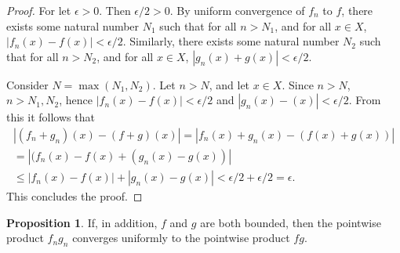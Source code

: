\documentclass[12pt]{article}
\theoremstyle{definition}
\newtheorem{proposition}{Proposition}
\begin{document}
\begin{proof}
For let $\epsilon > 0$. Then $\epsilon /2 > 0$. By uniform convergence of $ f_n $ to $f$, there exists some natural number $N_1$ such that for all 
$n>N_1$, and for all $x\in X$, $ |f_n(x) - f(x) | < \epsilon/2 $. Similarly, there exists some natural number $N_2$ such that for all $n>N_2$, and for 
all $x\in X $, $| g_n(x) + g(x) | < \epsilon /2$. 

Consider $ N = \max(N_1, N_2)$. Let $n> N$, and let $x\in X$. Since $n> N$, $n> N_1, N_2$, hence $ |f_n(x) - f(x)| < \epsilon/2 $ and $ |g_n(x) - 
(x)|<\epsilon /2 $. From this it follows that 
\begin{equation}
	\begin{split}
		|(f_n + g_n)(x) - (f+g)(x)| = |f_n(x) + g_n(x) - (f(x) + g(x))| \\
		= |(f_n(x) - f(x) + (g_n(x) - g(x))| \\
		\le |f_n(x) - f(x)| + |g_n(x) - g(x)| < \epsilon/2 + \epsilon/2 = \epsilon.
	\end{split}
\end{equation}
This concludes the proof.
\end{proof}

\begin{proposition}
If, in addition, $f$ and $g$ are both bounded, then the pointwise product $f_ng_n$ converges uniformly to the pointwise product $fg$. 
\end{proposition}
\end{document}
